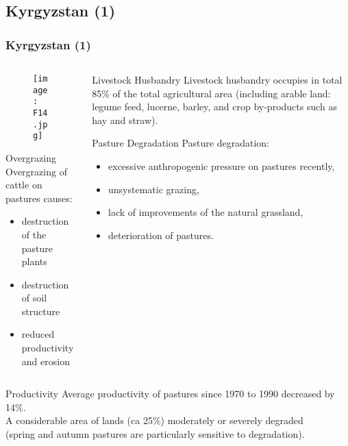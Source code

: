 \documentclass[pdflatex,compress,8pt,
	xcolor={dvipsnames,dvipsnames,svgnames,x11names,table},
	hyperref={colorlinks = true,
	breaklinks = true, 
	urlcolor = NavyBlue, 
	breaklinks = true}]{beamer}
\begin{document}
\subsection{Kyrgyzstan (1)}
\begin{frame}\frametitle{Kyrgyzstan (1)}
\begin{minipage}[0.4\textheight]{\textwidth}
\begin{columns}[T]
\begin{column}{0.5\textwidth}
\begin{figure}[H]
	\centering
		\texttt{[image: F14.jpg]}
\end{figure}

\begin{block}{Overgrazing}
Overgrazing of cattle on pastures causes:
\begin{itemize}
	\item destruction of the pasture plants
	\item destruction of soil structure
	\item reduced productivity and erosion
\end{itemize}
\end{block}

\end{column}
\begin{column}{0.5\textwidth}
\vspace{2em}
\begin{alertblock}{Livestock Husbandry}
Livestock husbandry occupies in total 85\% of the total agricultural area (including arable land: legume feed, lucerne, barley, and crop by-products such as hay and straw).
\end{alertblock}

\begin{block}{Pasture Degradation}
Pasture degradation: 
	\begin{itemize}
		\item excessive anthropogenic pressure on pastures recently,
		\item unsystematic grazing,
		\item lack of improvements of the natural grassland,
		\item deterioration of pastures.
	\end{itemize}
\end{block}

\end{column}
\end{columns}
\end{minipage}

\begin{examples}{Productivity}
Average productivity of pastures since 1970 to 1990 decreased by 14\%. \\
A considerable area of lands (ca 25\%) moderately or severely degraded \\
(spring and autumn pastures are particularly sensitive to degradation).
\end{examples}

\end{frame}
\end{document}
